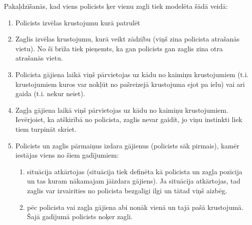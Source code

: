\documentclass{boi2014-lv}
\begin{document}
	Pakaļdzīšanās, kad viens policists ķer vienu zagli tiek modelēta šādā veidā:
    \begin{enumerate}
        \item Policists izvēlas krustojumu kurā patrulēt
        \item Zaglis izvēlas krustojumu, kurā veikt zādzību (viņš zina policista atrašanās vietu). No šī brīža tiek pieņemts, ka gan policists gan zaglis zina otra atrašanās vietu.
        \item Policista gājiena laikā viņš pārvietojas uz kādu no kaimiņu krustojumiem (t.i. krustojumiem kuros var nokļūt no pašreizejā krustojuma ejot pa ielu) vai ari gaida (t.i. nekur neiet).
        \item Zagļa gājiena laikā viņš pārvietojas uz kādu no kaimiņu krustojumiem. Ievērjoiet, ka atškirībā no policista, zaglis nevar gaidīt, jo viņu instinkti liek tiem turpināt skriet.
        \item Policists un zaglis pārmaiņus izdara gājienus (policists sāk pirmais), kamēr iestājas viens no šiem gadījumiem:
        \begin{enumerate}
            \item situācija atkārtojas (situācija tiek definēta kā policista un zagļa pozīcija un tas kuram nākamajam jāizdara gājiens).  Ja situācija atkārtojas, tad zaglis var izvairities no policista bezgalīgi ilgi un tātad viņš aizbēg.
            \item pēc policista vai zagļa gājiena abi nonāk vienā un tajā pašā krustojumā. Šajā gadījumā policists noķer zagli.
        \end{enumerate}
    \end{enumerate}
\end{document}

